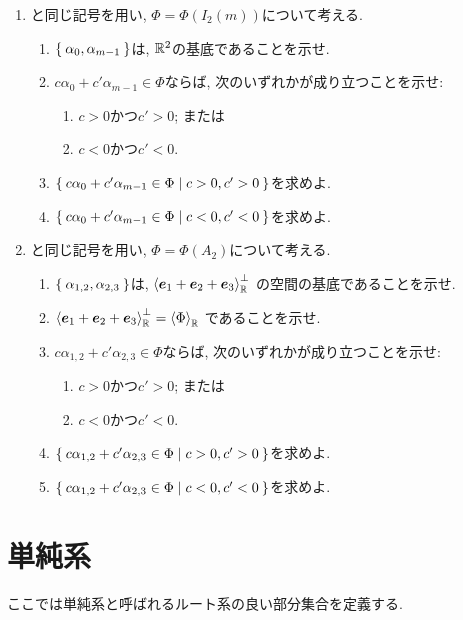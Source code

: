 \begin{enumerate}
\item
  と同じ記号を用い,
  $\Phi=\Phi(I_2(m))$について考える.
  \begin{enumerate}
  \item $\Set{\alpha_0,\alpha_{m-1}}$は, $\mathbb{R}^2$の基底であることを示せ.
  \item $c\alpha_0+c'\alpha_{m-1}\in \Phi$ならば, 次のいずれかが成り立つことを示せ:
    \begin{enumerate}
      \item $c>0$かつ$c'>0$; または
      \item $c<0$かつ$c'<0$.
    \end{enumerate}
  \item $\Set{c\alpha_0+c'\alpha_{m-1}\in \Phi|c>0,c'>0}$を求めよ.
  \item $\Set{c\alpha_0+c'\alpha_{m-1}\in \Phi|c<0,c'<0}$を求めよ.
  \end{enumerate}
\item
  と同じ記号を用い,
  $\Phi=\Phi(A_2)$について考える.
  \begin{enumerate}
  \item
    $\Set{\alpha_{1,2},\alpha_{2,3}}$は,
    $\Braket{\boldsymbol{e}_1+\boldsymbol{e}_2+\boldsymbol{e}_3}_{\mathbb{R}}^{\perp}$
    の空間の基底であることを示せ.
  \item
    $\Braket{\boldsymbol{e}_1+\boldsymbol{e}_2+\boldsymbol{e}_3}_{\mathbb{R}}^{\perp}=\Braket{\Phi}_{\mathbb{R}}$
    であることを示せ.
  \item
    $c\alpha_{1,2}+c'\alpha_{2,3}\in \Phi$ならば, 次のいずれかが成り立つことを示せ:
    \begin{enumerate}
      \item $c>0$かつ$c'>0$; または
      \item $c<0$かつ$c'<0$.
    \end{enumerate}
  \item $\Set{c\alpha_{1,2}+c'\alpha_{2,3}\in \Phi|c>0,c'>0}$を求めよ.
  \item $\Set{c\alpha_{1,2}+c'\alpha_{2,3}\in \Phi|c<0,c'<0}$を求めよ.
  \end{enumerate}
\end{enumerate}


\chapter{単純系}
ここでは単純系と呼ばれるルート系の良い部分集合を定義する.

